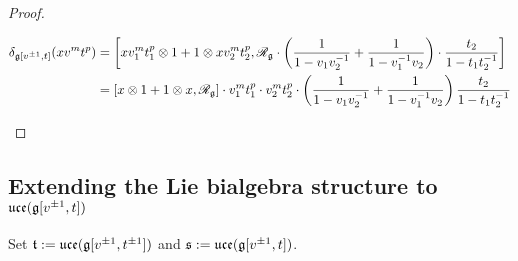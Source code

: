 \begin{proof}
\begin{enumerate}
                            $$
                                \begin{aligned}
                                    \delta_{\g[v^{\pm 1}, t]}( x v^m t^p ) & = \left[x v_1^m t_1^p \tensor 1 + 1 \tensor x v_2^m t_2^p, \scrR_{\g} \cdot \left( \frac{1}{1 - v_1 v_2^{-1}} + \frac{1}{1 - v_1^{-1} v_2} \right) \cdot \frac{t_2}{1 - t_1 t_2^{-1}}\right]
                                    \\
                                    & = [x \tensor 1 + 1 \tensor x, \scrR_{\g}] \cdot v_1^m t_1^p \cdot v_2^m t_2^p \cdot \left( \frac{1}{1 - v_1 v_2^{-1}} + \frac{1}{1 - v_1^{-1} v_2} \right) \frac{t_2}{1 - t_1 t_2^{-1}}
                                \end{aligned}
                            $$
                    \end{enumerate}
                \end{proof}

        \subsection{Extending the Lie bialgebra structure to \texorpdfstring{$\mathfrak{uce}( \mathfrak{g}[v^{\pm 1}, t] )$}{}}
            \begin{convention}
                Set $\mathfrak{t} := \mathfrak{uce}( \mathfrak{g}[v^{\pm 1}, t^{\pm 1}] )$ and $\mathfrak{s} := \mathfrak{uce}( \mathfrak{g}[v^{\pm 1}, t] )$. 
            \end{convention}
        
